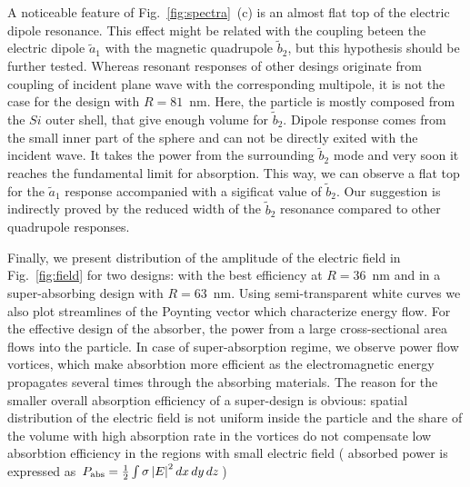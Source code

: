 \documentclass[aps,prl,twocolumn,showpacs,superscriptaddress,groupedaddress]{revtex4-1}
\begin{document}
A noticeable feature of Fig.~\ref{fig:spectra}~(c) is an almost flat top
of the electric dipole resonance.  
This effect might be related with the coupling beteen the electric
dipole $\tilde{a}_1$ with the magnetic quadrupole $\tilde{b}_2$, but
this hypothesis should be further tested.  Whereas resonant responses
of other desings originate from coupling of incident plane wave with
the corresponding multipole, it is not the case for the design with
$R=81$~nm. Here, the particle is mostly composed from the $Si$ outer
shell, that give enough volume for $\tilde{b}_2$.  Dipole response
comes from the small inner part of the sphere and can not be directly
exited with the incident wave.  It takes the power from the
surrounding $\tilde{b}_2$ mode and very soon it reaches the
fundamental limit for absorption.  This way, we can observe a flat top
for the $\tilde{a}_1$ response accompanied with a sigificat value of
$\tilde{b}_2$.  Our suggestion is indirectly proved by the reduced
width of the $\tilde{b}_2$ resonance compared to other quadrupole
responses.

\begin{figure}
\end{figure}
Finally, we present distribution of the amplitude of the electric
field in Fig.~\ref{fig:field} for two designs: with the best
efficiency at $R=36$~nm and in a super-absorbing design with
$R=63$~nm.  Using semi-transparent white curves we also plot
streamlines of the Poynting vector which characterize energy flow.
For the effective design of the absorber, the power from a large
cross-sectional area flows into the particle.  In case of
super-absorption regime, we observe power flow vortices, which make
absorbtion more efficient as the electromagnetic energy propagates
several times through the absorbing materials.  The reason for the
smaller overall absorption efficiency of a super-design is obvious:
spatial distribution of the electric field is not uniform inside the
particle and the share of the volume with high absorption rate in the
vortices do not compensate low absorbtion efficiency in the regions
with small electric field ( absorbed power is expressed as $P_{\rm
  abs}=\frac{1}{2}\int\sigma \left|E\right|^2dx\,dy\,dz$)
\end{document}
